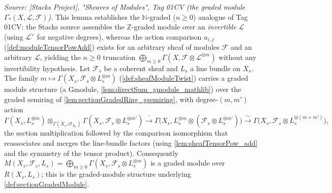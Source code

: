 \begin{lemma}
  \label{lem:sectionGradedModule_gmodule}
  \textit{Source: [Stacks Project], "Sheaves of Modules", Tag 01CV (the graded
  module \(\Gamma_*(X,\mathcal{L},\mathcal{F})\)).}
  This lemma establishes the \(\mathbb{N}\)-graded (\(n\ge 0\)) analogue of Tag 01CV: the
  Stacks source assembles the \(\mathbb{Z}\)-graded module over an \emph{invertible}
  \(\mathcal{L}\) (using \(\mathcal{L}^\vee\) for negative degrees), whereas the
  action comparison \(a_{i,j}\) (\cref{def:moduleTensorPowAdd}) exists for an
  arbitrary sheaf of modules \(\mathcal{F}\) and an arbitrary \(\mathcal{L}\), yielding
  the \(n\ge 0\) truncation \(\bigoplus_{m\ge 0}\Gamma(X,\mathcal{F}\otimes
  \mathcal{L}^{\otimes m})\) without any invertibility hypothesis.
  Let \(\mathcal{F}_s\) be a coherent sheaf and \(L_s\) a line bundle on
  \(X_s\). The family
  \(m \mapsto \Gamma(X_s, \mathcal{F}_s \otimes L_s^{\otimes m})\)
  (\cref{def:sheafModuleTwist}) carries a graded module structure (a
  \(\mathrm{Gmodule}\), \cref{lem:directSum_gmodule_mathlib}) over the graded
  semiring of \cref{lem:sectionGradedRing_gsemiring}, with degree-\((m,m')\)
  action
  \[
    \Gamma(X_s, L_s^{\otimes m}) \otimes_{\Gamma(X_s,\mathcal{O}_{X_s})}
      \Gamma(X_s, \mathcal{F}_s \otimes L_s^{\otimes m'})
    \xrightarrow{\ \cdot\ }
    \Gamma\bigl(X_s, L_s^{\otimes m} \otimes
      (\mathcal{F}_s \otimes L_s^{\otimes m'})\bigr)
    \xrightarrow{\ \sim\ }
    \Gamma\bigl(X_s, \mathcal{F}_s \otimes L_s^{\otimes (m+m')}\bigr),
  \]
  the section multiplication followed by the comparison isomorphism that
  reassociates and merges the line-bundle factors (using
  \cref{lem:sheafTensorPow_add} and the symmetry of the tensor product).
  Consequently \(M(X_s, \mathcal{F}_s, L_s) = \bigoplus_{m \ge 0}
  \Gamma(X_s, \mathcal{F}_s \otimes L_s^{\otimes m})\) is a graded module over
  \(R(X_s, L_s)\); this is the graded-module structure underlying
  \cref{def:sectionGradedModule}.
\end{lemma}

